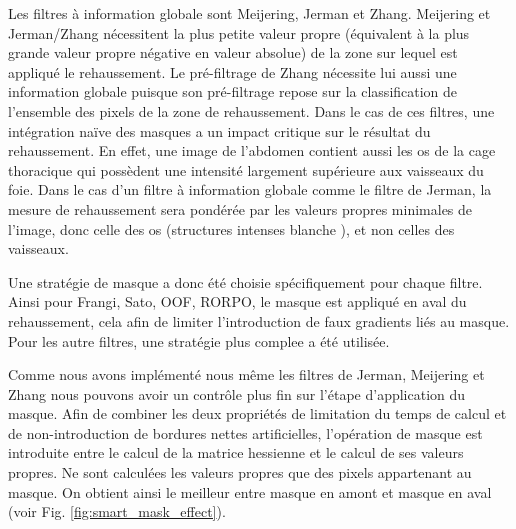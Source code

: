 Les filtres à information globale sont Meijering, Jerman et Zhang. Meijering et Jerman/Zhang nécessitent la plus petite valeur propre (équivalent à la plus grande valeur propre négative en valeur absolue) de la zone sur lequel est appliqué le rehaussement. Le pré-filtrage de Zhang nécessite lui aussi une information globale puisque son pré-filtrage repose sur la classification de l'ensemble des pixels de la zone de rehaussement. Dans le cas de ces filtres, une intégration naïve des masques a un impact critique sur le résultat du rehaussement. En effet, une image de l'abdomen contient aussi les os de la cage thoracique qui possèdent une intensité largement supérieure aux vaisseaux du foie. Dans le cas d'un filtre à information globale comme le filtre de Jerman, la mesure de rehaussement sera pondérée par les valeurs propres minimales de l'image, donc celle des os (structures intenses blanche ), et non celles des vaisseaux. 

Une stratégie de masque a donc été choisie spécifiquement pour chaque filtre. Ainsi pour Frangi, Sato, OOF, RORPO, le masque est appliqué en aval du rehaussement, cela afin de limiter l'introduction de faux gradients liés au masque. Pour les autre filtres, une stratégie plus complee a été utilisée.

Comme nous avons implémenté nous même les filtres de Jerman, Meijering et Zhang nous pouvons avoir un contrôle plus fin sur l'étape d'application du masque. Afin de combiner les deux propriétés de limitation du temps de calcul et de non-introduction de bordures nettes artificielles, l'opération de masque est introduite entre le calcul de la matrice hessienne et le calcul de ses valeurs propres. Ne sont calculées les valeurs propres que des pixels appartenant au masque. On obtient ainsi le meilleur entre masque en amont et masque en aval (voir Fig. \ref{fig:smart_mask_effect}).

